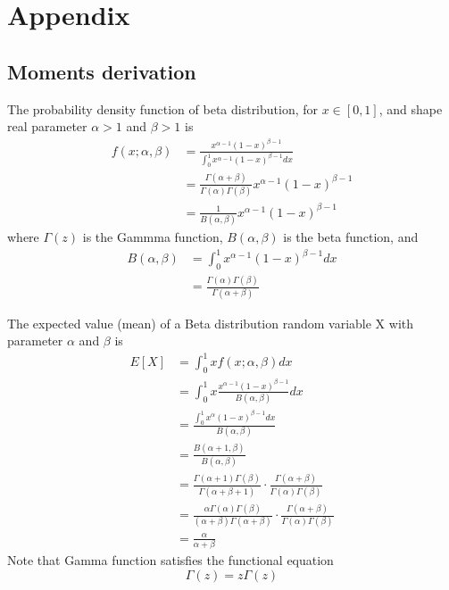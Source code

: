 \documentclass[11pt,reqno]{amsart}
\begin{document}
\section{Appendix}
\subsection{Moments derivation}
The probability density function of beta distribution, for $x\in[0,1]$, and shape real parameter $\alpha>1$ and $\beta>1$ is 
\begin{equation}
\begin{split}
  f(x;\alpha,\beta) &= \frac{x^{\alpha-1}(1-x)^{\beta-1}}{\int_0^1x^{\alpha-1}(1-x)^{\beta-1}dx}\\ &=\frac{\Gamma(\alpha+\beta)}{\Gamma(\alpha)\Gamma(\beta)}x^{\alpha-1}(1-x)^{\beta-1}\\ &=\frac{1}{B(\alpha,\beta)}x^{\alpha-1}(1-x)^{\beta-1}
\end{split}
\end{equation}
where $\Gamma(z)$ is the Gammma function, $B(\alpha,\beta)$ is the beta function, and
\begin{equation}
\begin{split}
 B(\alpha,\beta) &=\int_0^1x^{\alpha-1}(1-x)^{\beta-1}dx\\  &= \frac{\Gamma(\alpha)\Gamma(\beta)}{\Gamma(\alpha+\beta)}
\end{split}
\end{equation}

The expected value (mean) of a Beta distribution random variable X with parameter $\alpha$ and $\beta$ is 
\begin{equation}
\begin{split}
  E[X] &= \int_0^1xf(x;\alpha,\beta)dx\\ &= \int_0^1x\frac{x^{\alpha-1}(1-x)^{\beta-1}}{B(\alpha,\beta)}dx\\ &= \frac{\int_0^1x^{\alpha}(1-x)^{\beta-1}dx}{B(\alpha,\beta)}\\ &= \frac{B(\alpha+1,\beta)}{B(\alpha,\beta)}\\ &= \frac{\Gamma(\alpha+1)\Gamma(\beta)}{\Gamma(\alpha+\beta+1)}\cdot\frac{\Gamma(\alpha+\beta)}{\Gamma(\alpha)\Gamma(\beta)}\\ &= \frac{\alpha\Gamma(\alpha)\Gamma(\beta)}{(\alpha+\beta)\Gamma(\alpha+\beta)}\cdot\frac{\Gamma(\alpha+\beta)}{\Gamma(\alpha)\Gamma(\beta)}\\ &= \frac{\alpha}{\alpha+\beta}
\end{split}
\end{equation}
Note that Gamma function satisfies the functional equation
\begin{equation}
 \Gamma(z) = z\Gamma(z)
\end{equation}
\end{document}
